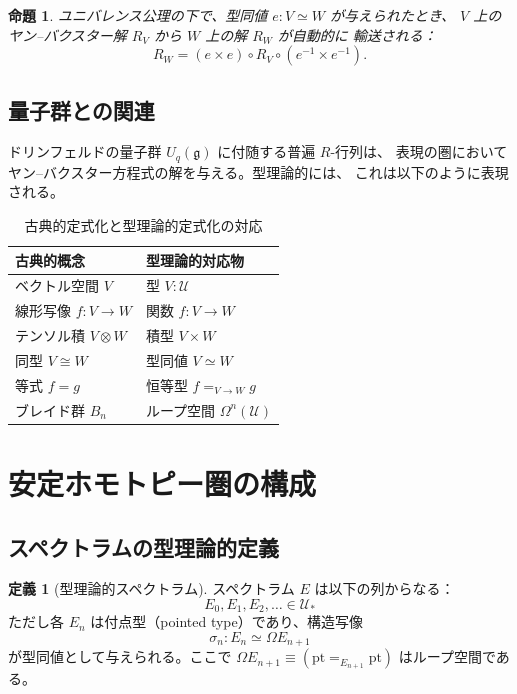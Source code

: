 \documentclass[12pt,a4paper]{article}
\newtheorem{proposition}[theorem]{命題}
\theoremstyle{definition}
\newtheorem{definition}{定義}[section]
\begin{document}
\begin{proposition}
ユニバレンス公理の下で、型同値 $e : V \simeq W$ が与えられたとき、
$V$ 上のヤン--バクスター解 $R_V$ から $W$ 上の解 $R_W$ が自動的に
輸送される：
\begin{equation}
  R_W = (e \times e) \circ R_V \circ (e^{-1} \times e^{-1}).
\end{equation}
\end{proposition}

\subsection{量子群との関連}

ドリンフェルドの量子群 $U_q(\mathfrak{g})$ に付随する普遍 $R$-行列は、
表現の圏においてヤン--バクスター方程式の解を与える。型理論的には、
これは以下のように表現される。

\begin{table}[H]
\centering
\caption{古典的定式化と型理論的定式化の対応}\label{tab:correspondence}
\begin{tabular}{@{}ll@{}}
\toprule
古典的概念 & 型理論的対応物 \\
\midrule
ベクトル空間 $V$ & 型 $V : \mathcal{U}$ \\
線形写像 $f : V \to W$ & 関数 $f : V \to W$ \\
テンソル積 $V \otimes W$ & 積型 $V \times W$ \\
同型 $V \cong W$ & 型同値 $V \simeq W$ \\
等式 $f = g$ & 恒等型 $f =_{V \to W} g$ \\
ブレイド群 $B_n$ & ループ空間 $\Omega^n(\mathcal{U})$ \\
\bottomrule
\end{tabular}
\end{table}


\section{安定ホモトピー圏の構成}

\subsection{スペクトラムの型理論的定義}

\begin{definition}[型理論的スペクトラム]
スペクトラム $E$ は以下の列からなる：
\begin{equation}
  E_0, E_1, E_2, \ldots \in \mathcal{U}_*
\end{equation}
ただし各 $E_n$ は付点型（pointed type）であり、構造写像
\begin{equation}
  \sigma_n : E_n \simeq \Omega E_{n+1}
\end{equation}
が型同値として与えられる。ここで $\Omega E_{n+1} \equiv
(\mathrm{pt} =_{E_{n+1}} \mathrm{pt})$ はループ空間である。
\end{definition}
\end{document}
